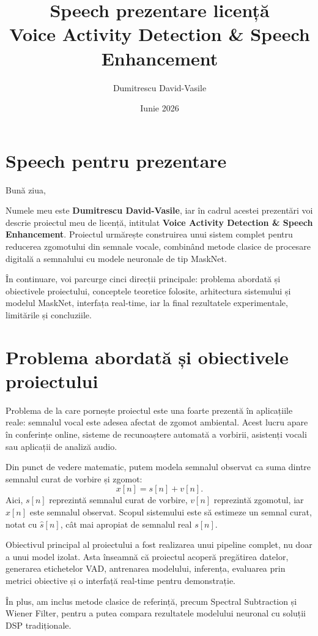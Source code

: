 \documentclass[12pt,a4paper]{article}
\title{\textbf{Speech prezentare licență}\\
\large Voice Activity Detection \& Speech Enhancement}
\author{Dumitrescu David-Vasile}
\date{Iunie 2026}
\begin{document}
\maketitle

\section*{Speech pentru prezentare}

Bună ziua,

Numele meu este \textbf{Dumitrescu David-Vasile}, iar în cadrul acestei prezentări voi descrie proiectul meu de licență, intitulat \textbf{Voice Activity Detection \& Speech Enhancement}. Proiectul urmărește construirea unui sistem complet pentru reducerea zgomotului din semnale vocale, combinând metode clasice de procesare digitală a semnalului cu modele neuronale de tip MaskNet.

În continuare, voi parcurge cinci direcții principale: problema abordată și obiectivele proiectului, conceptele teoretice folosite, arhitectura sistemului și modelul MaskNet, interfața real-time, iar la final rezultatele experimentale, limitările și concluziile.

\section*{Problema abordată și obiectivele proiectului}

Problema de la care pornește proiectul este una foarte prezentă în aplicațiile reale: semnalul vocal este adesea afectat de zgomot ambiental. Acest lucru apare în conferințe online, sisteme de recunoaștere automată a vorbirii, asistenți vocali sau aplicații de analiză audio.

Din punct de vedere matematic, putem modela semnalul observat ca suma dintre semnalul curat de vorbire și zgomot:
\[
    x[n] = s[n] + v[n].
\]
Aici, \(s[n]\) reprezintă semnalul curat de vorbire, \(v[n]\) reprezintă zgomotul, iar \(x[n]\) este semnalul observat. Scopul sistemului este să estimeze un semnal curat, notat cu \(\hat{s}[n]\), cât mai apropiat de semnalul real \(s[n]\).

Obiectivul principal al proiectului a fost realizarea unui pipeline complet, nu doar a unui model izolat. Asta înseamnă că proiectul acoperă pregătirea datelor, generarea etichetelor VAD, antrenarea modelului, inferența, evaluarea prin metrici obiective și o interfață real-time pentru demonstrație.

În plus, am inclus metode clasice de referință, precum Spectral Subtraction și Wiener Filter, pentru a putea compara rezultatele modelului neuronal cu soluții DSP tradiționale.
\end{document}
